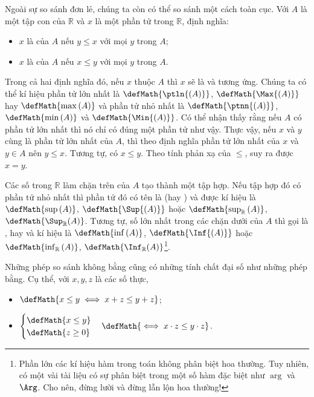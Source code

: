 Ngoài sự so sánh đơn lẻ, chúng ta còn có thể so sánh một cách toàn cục. Với $A$ là một tập con của $\mathbb{R}$ và $x$ là một phần tử trong $\mathbb{R}$, định nghĩa:
\begin{itemize}
   \item $x$ là  của $A$ nếu $y \leq x$ với mọi $y$ trong $A$;
   \item $x$ là  của $A$ nếu $x \leq y$ với mọi $y$ trong $A$.
\end{itemize}
Trong cả hai định nghĩa đó, nếu $x$ thuộc $A$ thì $x$ sẽ là  và  tương ứng. Chúng ta có thể kí hiệu phần tử lớn nhất là $\defMath{\ptln{(A)}}$, $\defMath{\Max{(A)}}$ hay $\defMath{\max{(A)}}$ và phần tử nhỏ nhất là $\defMath{\ptnn{(A)}}$, $\defMath{\min{(A)}}$ và $\defMath{\Min{(A)}}$. Có thể nhận thấy rằng nếu $A$ có phần tử lớn nhất thì nó chỉ có đúng một phần tử như vậy. Thực vậy, nếu $x$ và $y$ cùng là phần tử lớn nhất của $A$, thì theo định nghĩa phần tử lớn nhất của $x$ và $y \in A$ nên $y \leq x$. Tương tự, có $x \leq y$. Theo tính phản xạ của $\le$, suy ra được $x = y$.

Các số trong $\mathbb{R}$ làm chặn trên của $A$ tạo thành một tập hợp. Nếu tập hợp đó có phần tử nhỏ nhất thì phần tử đó có tên là  (hay ) và được kí hiệu là $\defMath{\sup{(A)}}$, $\defMath{\Sup{(A)}}$ hoặc $\defMath{\sup_{\mathbb{R}}{(A)}}$, $\defMath{\Sup_{\mathbb{R}}{(A)}}$. Tương tự, số lớn nhất trong các chặn dưới của $A$ thì gọi là , hay  và kí hiệu là $\defMath{\inf{(A)}}$, $\defMath{\Inf{(A)}}$ hoặc $\defMath{\inf_{\mathbb{R}}{(A)}}$, $\defMath{\Inf_{\mathbb{R}}{(A)}}$\footnote{Phần lớn các kí hiệu hàm trong toán không phân biệt hoa thường. Tuy nhiên, có một vài tài liệu có sự phân biệt trong một số hàm đặc biệt như $\arg$ và $\Arg$. Cho nên, đừng lười và đừng lẫn lộn hoa thường!}.

Những phép so sánh không bằng cũng có những tính chất đại số như những phép bằng. Cụ thể, với $x, y, z$ là các số thực,
\begin{itemize}
   \item $\defMath{x \le y \iff x + z \le y + z}$;
   \item $\begin{cases}
      \defMath{x \le y }\\
      \defMath{z \ge 0}
   \end{cases} \defMath{\iff x\cdot z \le y\cdot z}$.
\end{itemize}

